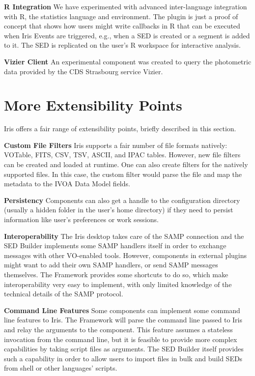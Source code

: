\documentclass[11pt,twoside]{article}
\begin{document}
\textbf{R Integration}
We have experimented with advanced inter-language integration with R, the statistics language and environment. The plugin is just a proof of concept that shows how users might write callbacks in R that can be executed when Iris Events are triggered, e.g., when a SED is created or a segment is added to it. The SED is replicated on the user's R workspace for interactive analysis.

\textbf{Vizier Client}
An experimental component was created to query the photometric data provided by the CDS Strasbourg service Vizier.

\section{More Extensibility Points}
Iris offers a fair range of extensibility points, briefly described in this section.

\textbf{Custom File Filters}
Iris supports a fair number of file formats natively: VOTable, FITS, CSV, TSV, ASCII, and IPAC tables. However, new file filters can be created and loaded at runtime. One can also create filters for the natively supported files. In this case, the custom filter would parse the file and map the metadata to the IVOA Data Model fields.

\textbf{Persistency}
Components can also get a handle to the configuration directory (usually a hidden folder in the user's home directory) if they need to persist information like user's preferences or work sessions.

\textbf{Interoperability}
The Iris desktop takes care of the SAMP connection and the SED Builder implements some SAMP handlers itself in order to exchange messages with other VO-enabled tools. However, components in external plugins might want to add their own SAMP handlers, or send SAMP messages themselves. The Framework provides some shortcuts to do so, which make interoperability very easy to implement, with only limited knowledge of the technical details of the SAMP protocol.

\textbf{Command Line Features}
Some components can implement some command line features to Iris. The Framework will parse the command line passed to Iris and relay the arguments to the component. This feature assumes a stateless invocation from the command line, but it is feasible to provide more complex capabilities by taking script files as arguments. The SED Builder itself provides such a capability in order to allow users to import files in bulk and build SEDs from shell or other languages' scripts.
\end{document}
